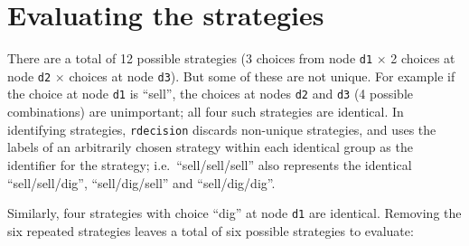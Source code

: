 \documentclass[
]{article}
\newenvironment{Shaded}{\begin{snugshade}}{\end{snugshade}}
\newcommand{\CommentTok}[1]{\textcolor[rgb]{0.56,0.35,0.01}{\textit{#1}}}
\newcommand{\DataTypeTok}[1]{\textcolor[rgb]{0.13,0.29,0.53}{#1}}
\newcommand{\DecValTok}[1]{\textcolor[rgb]{0.00,0.00,0.81}{#1}}
\newcommand{\KeywordTok}[1]{\textcolor[rgb]{0.13,0.29,0.53}{\textbf{#1}}}
\newcommand{\NormalTok}[1]{#1}
\newcommand{\OperatorTok}[1]{\textcolor[rgb]{0.81,0.36,0.00}{\textbf{#1}}}
\newcommand{\OtherTok}[1]{\textcolor[rgb]{0.56,0.35,0.01}{#1}}
\newcommand{\StringTok}[1]{\textcolor[rgb]{0.31,0.60,0.02}{#1}}
\begin{document}
\begin{Shaded}
\end{Shaded}

\hypertarget{evaluating-the-strategies}{%
\section{Evaluating the strategies}\label{evaluating-the-strategies}}

There are a total of 12 possible strategies (3 choices from node
\texttt{d1} \(\times\) 2 choices at node \texttt{d2} \(\times\) choices
at node \texttt{d3}). But some of these are not unique. For example if
the choice at node \texttt{d1} is ``sell'', the choices at nodes
\texttt{d2} and \texttt{d3} (4 possible combinations) are unimportant;
all four such strategies are identical. In identifying strategies,
\texttt{rdecision} discards non-unique strategies, and uses the labels
of an arbitrarily chosen strategy within each identical group as the
identifier for the strategy; i.e.~``sell/sell/sell'' also represents the
identical ``sell/sell/dig'', ``sell/dig/sell'' and ``sell/dig/dig''.

Similarly, four strategies with choice ``dig'' at node \texttt{d1} are
identical. Removing the six repeated strategies leaves a total of six
possible strategies to evaluate:

\begin{Shaded}
\end{Shaded}
\end{document}
